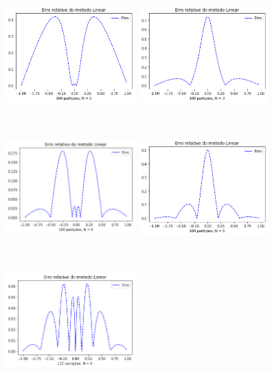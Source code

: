 \documentclass{article}
\begin{document}
\begin{figure}[!htb]
\centering
\includegraphics [width=5cm,height=5cm]{ELc2.png}
\includegraphics [width=5cm,height=5cm]{ELc3.png}
\includegraphics [width=5cm,height=5cm]{ELc4.png}
\includegraphics [width=5cm,height=5cm]{ELc5.png}
\includegraphics [width=5cm,height=5cm]{ELc6.png}

\end{figure}
\end{document}
